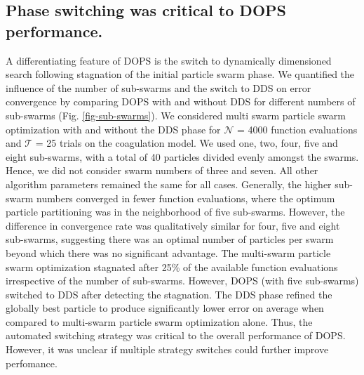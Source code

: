\documentclass{bmcart}
\begin{document}
\subsection*{Phase switching was critical to DOPS performance.}
A differentiating feature of DOPS is the switch to dynamically dimensioned search following stagnation of the initial particle swarm phase.
We quantified the influence of the number of sub-swarms and the switch to DDS on error convergence by comparing DOPS with and without DDS for different numbers of sub-swarms (Fig. \ref{fig-sub-swarms}).
We considered multi swarm particle swarm optimization with and without the DDS phase for $\mathcal{N}$ = 4000 function evaluations and $\mathcal{T}$ = 25 trials on the coagulation model.
We used one, two, four, five and eight sub-swarms, with a total of 40 particles divided evenly amongst the swarms.
Hence, we did not consider swarm numbers of three and seven.
All other algorithm parameters remained the same for all cases.
Generally, the higher sub-swarm numbers converged in fewer function evaluations, where the optimum particle partitioning was in the neighborhood of five sub-swarms.
However, the difference in convergence rate was qualitatively similar for four, five and eight sub-swarms, suggesting there was an optimal number of particles per swarm beyond
which there was no significant advantage.
The multi-swarm particle swarm optimization stagnated after 25\% of the available function evaluations irrespective of the number of sub-swarms.
However, DOPS (with five sub-swarms) switched to DDS after detecting the stagnation.
The DDS phase refined the globally best particle to produce significantly lower error on average when compared to multi-swarm particle swarm optimization alone.
Thus, the automated switching strategy was critical to the overall performance of DOPS. However, it was unclear if multiple strategy switches could further improve perfomance.
\end{document}
